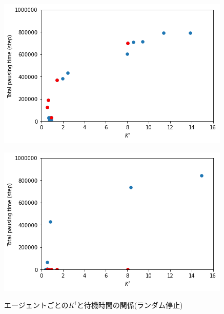 \documentclass[12pt,a4j,twoside]{jarticle}
\begin{document}
  \begin{figure}
    \begin{minipage}{0.48\hsize}
      \centering
      \includegraphics[width=0.99\hsize]{figures/CorrectionScatter_Office_RandomStop_before.png}
      \label{subfig:cscatter_RandomStop_before}  
    \end{minipage}
    \hfill
    \begin{minipage}{0.48\hsize}
      \centering
      \includegraphics[width=0.99\hsize]{figures/CorrectionScatter_Office_RandomStop_after.png}
      \label{subfig:cscatter_RandomStop_after}  
    \end{minipage}
    \caption{エージェントごとの$K^i$と待機時間の関係(ランダム停止)}
    \label{fig:cscatter_RandomStop}
  \end{figure}
\end{document}
